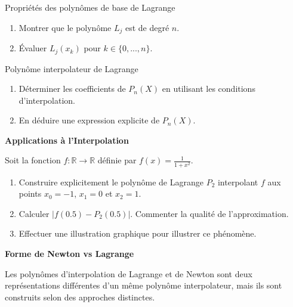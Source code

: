 \documentclass[10pt,a4paper]{article}
\begin{document}
\q Propriétés des polynômes de base de Lagrange

\begin{enumerate}
   \item Montrer que le polynôme \( L_j \) est de degré \( n \).
   \item Évaluer \( L_j(x_k) \) pour \( k \in \{0, ..., n\} \).
\end{enumerate}

\q Polynôme interpolateur de Lagrange

\begin{enumerate}
   \item Déterminer les coefficients de \( P_n(X) \) en utilisant les conditions d'interpolation.
   \item En déduire une expression explicite de \( P_n(X) \).
\end{enumerate}

\bigskip
\textbf{Applications à l'Interpolation}

\q Soit la fonction $f : \mathbb{R} \rightarrow \mathbb{R}$ définie par $f(x) = \frac{1}{1 + x^2}$.
\begin{enumerate}
   \item Construire explicitement le polynôme de Lagrange $P_2$ interpolant $f$ aux points $x_0 = -1$,
   $x_1 = 0$ et $x_2 = 1$.
   \item Calculer $|f(0.5) - P_2(0.5)|$. Commenter la qualité de l'approximation.
   \item Effectuer une illustration graphique pour illustrer ce phénomène.
\end{enumerate}

\bigskip
\textbf{Forme de Newton vs Lagrange}

Les polynômes d'interpolation de Lagrange et de Newton sont deux représentations différentes d'un
même polynôme interpolateur, mais ils sont construits selon des approches distinctes.
\end{document}
